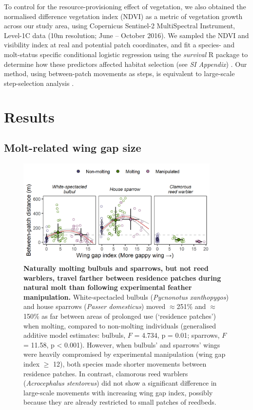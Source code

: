 \begin{refsection}
To control for the resource-provisioning effect of vegetation, we also obtained the normalised difference vegetation index (NDVI) as a metric of vegetation growth \citep{pettorelli2011} across our study area, using Copernicus Sentinel-2 MultiSpectral Instrument, Level-1C data (10m resolution; June -- October 2016).
We sampled the NDVI and visibility index at real and potential patch coordinates, and fit a species- and molt-status specific conditional logistic regression using the \textit{survival} R package to determine how these predictors affected habitat selection (see \textit{SI Appendix}) \cite{signer2019,fieberg2021}.
Our method, using between-patch movements as steps, is equivalent to large-scale step-selection analysis \citep{fieberg2021}.

\section*{Results}

\subsection*{Molt-related wing gap size}

\begin{figure}%
\centering
\includegraphics[width=0.9\textwidth]{figures/holeybirds/fig_02.png}
\caption{
    \textbf{Naturally molting bulbuls and sparrows, but not reed warblers, travel farther between residence patches during natural molt than following experimental feather manipulation.}
    White-spectacled bulbuls (\textit{Pycnonotus xanthopygos}) and house sparrows (\textit{Passer domesticus}) moved $\approx$251\% and $\approx$150\% as far between areas of prolonged use (`residence patches') when molting, compared to non-molting individuals (generalised additive model estimates: bulbuls, $F$ = 4.734, p = 0.01; sparrows, $F$ = 11.58, p < 0.001).
    However, when bulbuls' and sparrows' wings were heavily compromised by experimental manipulation (wing gap index $\geq$ 12), both species made shorter movements between residence patches.
    In contrast, clamorous reed warblers (\textit{Acrocephalus stentoreus}) did not show a significant difference in large-scale movements with increasing wing gap index, possibly because they are already restricted to small patches of reedbeds.
}\label{fig_holey_01}
\end{figure}


\end{refsection}
